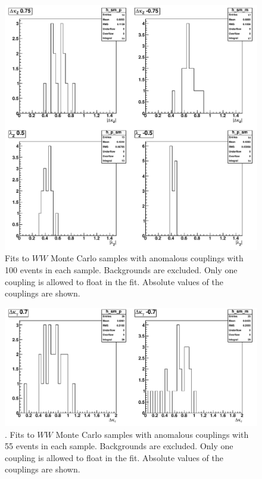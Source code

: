\begin{figure}[tp]
  \centerline{
    \includegraphics[width=1.0\textwidth]{figures/fit_wwATGC_mc_1D_abs}
  }

  \caption[1D fits to WW aTGC Monte Carlo] {Fits to $WW$ Monte Carlo
    samples with anomalous couplings with 100 events in each sample. Backgrounds
    are excluded. Only one coupling is allowed to float in the fit. Absolute
    values of the couplings are shown.}
  \label{fig:fit_wwATGC_mc_1D_abs}
\end{figure}

\begin{figure}[tp]
  \centerline{
    \includegraphics[width=1.0\textwidth]{figures/fit_wwATGC_mc_1D_abs2}
  }

  \caption[1D fits to WW aTGC Monte Carlo] {. Fits to $WW$ Monte Carlo samples with anomalous
    couplings with 55 events in each sample. Backgrounds are
    excluded. Only one coupling is allowed to float in the
    fit. Absolute values of the couplings are
    shown.}  \label{fig:fit_wwATGC_mc_1D_abs2}
\end{figure}
